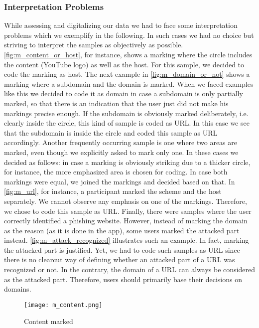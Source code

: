 \subsubsection{Interpretation Problems}
\label{s:intprobs}
While assessing and digitalizing our data we had to face some interpretation problems which we exemplify in the following.
In such cases we had no choice but striving to interpret the samples as objectively as possible.
\autoref{fig:m_content_or_host}, for instance, shows a marking where the circle includes the content (YouTube logo) as well as the host. 
For this sample, we decided to code the marking as host.
The next example in \autoref{fig:m_domain_or_not} shows a marking where a subdomain and the domain is marked. 
When we faced examples like this we decided to code it as domain in case a subdomain is only partially marked, so that there is an indication that the user just did not make his markings precise enough.
If the subdomain is obviously marked deliberately, i.e. clearly inside the circle, this kind of sample is coded as URL.
In this case we see that the subdomain is inside the circle and coded this sample as URL accordingly.
Another frequently occurring sample is one where two areas are marked, even though we explicitly asked to mark only one.
In these cases we decided as follows: in case a marking is obviously striking due to a thicker circle, for instance, the more emphasized area is chosen for coding.
In case both markings were equal, we joined the markings and decided based on that.
In \autoref{fig:m_url}, for instance, a participant marked the scheme and the host separately. 
We cannot observe any emphasis on one of the markings.
Therefore, we chose to code this sample as URL.
Finally, there were samples where the user correctly identified a phishing website.
However, instead of marking the domain as the reason (as it is done in the app), some users marked the attacked part instead.
\autoref{fig:m_attack_recognized} illustrates such an example.
In fact, marking the attacked part is justified. 
Yet, we had to code such samples as URL since there is no clearcut way of defining whether an attacked part of a URL was recognized or not.
In the contrary, the domain of a URL can always be considered as the attacked part. Therefore, users should primarily base their decisions on domains.

\begin{figure}
\centering
\texttt{[image: m\_content.png]}
\caption{Content marked}
\label{fig:content}
\end{figure}

